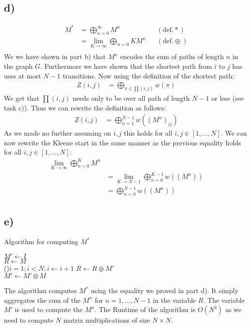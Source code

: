 \documentclass[a4paper,12pt]{ETHexercise}
\begin{document}
\subsection*{d)}
\begin{align}
    M^* &= \bigoplus^{\infty}_{n=0} M^n &&(\text{def.} *)\\
    &= \lim_{K \rightarrow \infty} \bigoplus_{n=0}{K} M^n &&(\text{def.} \oplus)\\
\end{align}
We we have shown in part b) that $M^n$ encodes the sum of paths of length $n$ in the graph $G$. Furthermore we have shown that the shortest path from $i$ to $j$ has uses at most $N-1$ transitions.
Now using the definition of the shortest path:
\begin{align}
    Z(i,j) &= \bigoplus_{\pi \in \prod(i,j)} w(\pi) \nonumber
\end{align}
We get that $\prod(i,j)$ needs only to be over all path of length $N-1$ or less (see task c)). Thus we can rewrite
the definition as follows:
\begin{align*}
    Z(i,j) &= \bigoplus_{n = 1}^{N-1} w((M^n)_{ij})
\end{align*}
As we made no further assuming on $i,j$ this holds for all $i,j \in [1,...,N]$.
We can now rewrite the Kleene start in the same manner as the previous equality holds for all $i,j \in [1,...,N]$:
\begin{align}
       \lim_{K \rightarrow \infty} \bigoplus_{n=0}^{K} M^n \\
    &= \lim_{K \rightarrow N-1} \bigoplus_{n = 0}^{K-1} w((M^n))\\
    &= \bigoplus_{n = 0}^{N-1} w((M^n))\\
\end{align}

\subsection*{e)}
\begin{algorithm}
    \SetAlgoLined
    \caption[]{Algorithm for computing $M^*$}
    $M' \gets I$\\
    $R  \gets M$\\
    \For(){$i = 1; i < N; i\gets i+1$}{
        $R \gets R \oplus M'$\\
        $M' \gets M' \otimes M$
    }
\end{algorithm}
The algorithm computes $M^*$ using the equality we proved in part d). It simply aggregates the sum of the $M^n$ for $n = 1,...,N-1$ in the variable $R$. The variable $M'$ is used to compute the $M^n$.
The Runtime of the algorithm is $O(N^3)$ as we need to compute $N$ matrix multiplications of size $N \times N$.
\end{document}
